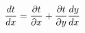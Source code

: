\documentclass[preview]{standalone}
\begin{document}
\begin{align*}
\special{dvisvgm:raw <g id='unique000'>}\frac{dt}{dx} = \frac{\partial t}{\partial x} + \frac{\partial t}{\partial y}\frac{dy}{dx}\special{dvisvgm:raw </g>}
\end{align*}
\end{document}
